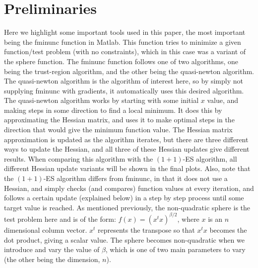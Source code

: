 \documentclass[sigconf, 7pt]{acmart}
\begin{document}
\section{Preliminaries}
\label{sec:pre}
Here we highlight some important tools used in this paper, the most important being the fminunc function in Matlab. This function tries to minimize a given function/test problem (with no constraints), which in this case was a variant of the sphere function. The fminunc function follows one of two algorithms, one being the trust-region algorithm, and the other being the quasi-newton algorithm. The quasi-newton algorithm is the algorithm of interest here, so by simply not supplying fminunc with gradients, it automatically uses this desired algorithm. The quasi-newton algorithm works by starting with some initial $x$ value, and making steps in some direction to find a local minimum. It does this by approximating the Hessian matrix, and uses it to make optimal steps in the direction that would give the minimum function value. The Hessian matrix approximation is updated as the algorithm iterates, but there are three different ways to update the Hessian, and all three of these Hessian updates give different results. When comparing this algorithm with the $(1+1)$-ES algorithm, all different Hessian update variants will be shown in the final plots. Also, note that the $(1+1)$-ES algorithm differs from fminunc, in that it does not use a Hessian, and simply checks (and compares) function values at every iteration, and follows a certain update (explained below) in a step by step process until some target value is reached. As mentioned previously, the non-quadratic sphere is the test problem here and is of the form: $f(x)=(x^tx)^{\beta/2}$, where $x$ is an $n$ dimensional column vector. $x^t$ represents the transpose so that $x^tx$ becomes the dot product, giving a scalar value. The sphere becomes non-quadratic when we introduce and vary the value of $\beta$, which is one of two main parameters to vary (the other being the dimension, $n$).
\end{document}

